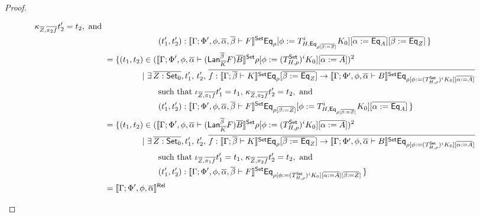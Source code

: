 \documentclass[acmsmall,review,anonymous]{acmart}
\theoremstyle{definition}
\newcommand{\set}{\mathsf{Set}}
\begin{document}
\begin{proof}
\begin{itemize}
\begin{itemize}
{\begin{align*}
  \kappa_{\ol Z, \ol{\pi_2 f}}t_2' = t_2, \mbox{ and }\\
  &\hspace*{0.9in}(t_1',t_2') : \oCPOsem{\Gamma;\Phi',
    \phi,\ol\alpha,\ol\beta \vdash F} \Eq_\rho [\phi :=
    T^i_{H,\Eq_{\rho[\ol{\beta:=Z}]}} K_0][\overline{\alpha :=
      \Eq_A}][\ol{\beta :=\Eq_Z}]\,\}\\ 
%
  &= \{(t_1,t_2) \in (\oCPOsem{\Gamma;\Phi',\phi,\ol\alpha
    \vdash (\Lan_{\ol K}^{\ol \beta} F)\ol{B}} \rho [\phi := 
    (T^\set_{H,{\rho}})^i K_0] [\overline{\alpha := A}])^2\\
  & \hspace*{0.63in}|~\exists\, \ol{Z : \oCPO_0}, t_1',\, t_2',\,
  \ol{f : \oCPOsem{\Gamma;\ol\beta \vdash K} \Eq_\rho[\overline{\beta :=
      \Eq_Z}]\to \oCPOsem{\Gamma;\Phi',
    \phi,\ol\alpha \vdash B} \Eq_{\rho[\phi := (T^\set_{H,{\rho}})^i K_0]
  [\overline{\alpha := A}]}}\\
  &\hspace{0.9in}\mbox{such that } \iota_{\ol Z,\ol{\pi_1 f}}t_1' = t_1,\,
  \kappa_{\ol Z,\ol{\pi_2 f}}t_2' = t_2, \mbox{ and }\\
  &\hspace*{0.9in}(t_1',t_2') : \oCPOsem{\Gamma;\Phi',
    \phi,\ol\alpha,\ol\beta \vdash F} \Eq_{\rho[\ol{\beta := Z}]}[\phi :=
      T^i_{H,\Eq_{\rho[\ol{\beta := Z}]}} K_0][\overline{\alpha :=
      \Eq_A}]\,\}\\
    &= \{(t_1,t_2) \in (\oCPOsem{\Gamma;\Phi',\phi,\ol\alpha
    \vdash (\Lan_{\ol K}^{\ol \beta} F)\ol{B}} \rho [\phi := 
    (T^\set_{H,{\rho}})^i K_0] [\overline{\alpha := A}])^2\\
  & \hspace*{0.63in}|~\exists\, \ol{Z : \oCPO_0}, t_1',\, t_2',\,
\ol{f : \oCPOsem{\Gamma;\ol\beta \vdash K} \Eq_\rho[\overline{\beta :=
      \Eq_Z}]\to \oCPOsem{\Gamma;\Phi',
    \phi,\ol\alpha \vdash B} \Eq_{\rho[\phi := (T^\set_{H,{\rho}})^i K_0]
  [\overline{\alpha := A}]}}\\
  &\hspace{0.9in}\mbox{such that } \iota_{\ol Z, \ol{\pi_1 f}}t_1' = t_1,\,
  \kappa_{\ol Z,\ol{\pi_2 f}}t_2' = t_2, \mbox{ and }\\
  &\hspace*{0.9in}(t_1',t_2') : \oCPOsem{\Gamma;\Phi',
    \phi,\ol\alpha,\ol\beta \vdash F} \Eq_{\rho[\phi :=
      (T^\set_{H,{\rho}})^i K_0][\overline{\alpha := A}][\ol{\beta :=Z}]}\,\}\\
%
  &=\oCPORsem{\Gamma;\Phi',\phi,\ol\alpha
}
\end{align*}}
\end{itemize}
\end{itemize}
\end{proof}
\end{document}
